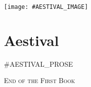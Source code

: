 \documentclass{amsbook}
\begin{document}
\thispagestyle{empty}
\vspace*{\fill}
{\centering
\texttt{[image: \#AESTIVAL\_IMAGE]}}
\vspace*{\fill}
\clearpage

\chapter{Aestival}

\renewcommand{\poemone}{
    #AESTIVAL_POEM_1
}
\renewcommand{\poemtwo}{
    #AESTIVAL_POEM_2
}
\renewcommand{\poemthree}{
    #AESTIVAL_POEM_3
}
\initprintpoems

#AESTIVAL_PROSE

\bigskip
\bigskip
\begin{center}
    \textsc{End of the First Book}
\end{center}
\end{document}
